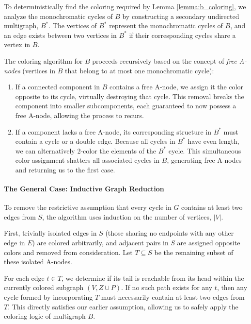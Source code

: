 To deterministically find the coloring required by Lemma \ref{lemma:b_coloring},
we analyze the monochromatic cycles of $B$ by constructing a secondary
undirected multigraph, $B^*$. The vertices of $B^*$ represent the monochromatic
cycles of $B$, and an edge exists between two vertices in $B^*$ if their
corresponding cycles share a vertex in $B$.

The coloring algorithm for $B$ proceeds recursively based on the concept of
\textit{free A-nodes} (vertices in $B$ that belong to at most one monochromatic
cycle):
\begin{enumerate}
    \item If a connected component in $B$ contains a free A-node, we assign it
    the color opposite to its cycle, virtually destroying that cycle. This
    removal breaks the component into smaller subcomponents, each guaranteed to
    now possess a free A-node, allowing the process to recurs.
    \item If a component lacks a free A-node, its corresponding structure in
    $B^*$ must contain a cycle or a double edge. Because all cycles in $B^*$
    have even length, we can alternatively 2-color the elements of the $B^*$
    cycle. This simultaneous color assignment shatters all associated cycles in
    $B$, generating free A-nodes and returning us to the first case.
\end{enumerate}

\paragraph{The General Case: Inductive Graph Reduction}
To remove the restrictive assumption that every cycle in $G$ contains at least
two edges from $S$, the algorithm uses induction on the number of vertices,
$|V|$.

First, trivially isolated edges in $S$ (those sharing no endpoints with any
other edge in $E$) are colored arbitrarily, and adjacent pairs in $S$ are
assigned opposite colors and removed from consideration. Let $T \subseteq S$ be
the remaining subset of these isolated A-nodes.

For each edge $t \in T$, we determine if its tail is reachable from its head
within the currently colored subgraph $(V, Z \cup P)$. If no such path exists
for any $t$, then any cycle formed by incorporating $T$ must necessarily contain
at least two edges from $T$. This directly satisfies our earlier assumption,
allowing us to safely apply the coloring logic of multigraph $B$.

